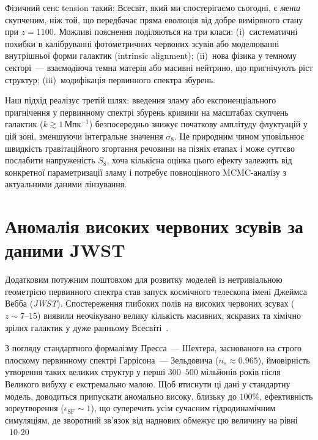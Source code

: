 Фізичний сенс tension такий: Всесвіт, який ми спостерігаємо сьогодні, є
\emph{менш} скупченим, ніж той, що передбачає пряма еволюція від добре
виміряного стану при $z=1100$. Можливі пояснення поділяються на три класи:
(i)~систематичні похибки в калібруванні фотометричних червоних зсувів або
моделюванні внутрішньої форми галактик (intrinsic alignment);
(ii)~нова фізика у темному секторі~--- взаємодіюча темна матерія або масивні
нейтрино, що пригнічують ріст структур;
(iii)~модифікація первинного спектра збурень.

Наш підхід реалізує третій шлях: введення зламу або експоненціального
пригнічення у первинному спектрі збурень кривини на масштабах скупчень
галактик ($k \gtrsim 1\,\text{Мпк}^{-1}$) безпосередньо знижує початкову
амплітуду флуктуацій у цій зоні, зменшуючи інтегральне значення $\sigma_8$.
Це природним чином уповільнює швидкість гравітаційного згортання речовини
на пізніх етапах і може суттєво послабити напруженість $S_8$, хоча кількісна
оцінка цього ефекту залежить від конкретної параметризації зламу і потребує
повноцінного MCMC-аналізу з актуальними даними лінзування.

\section{Аномалія високих червоних зсувів за даними JWST}
\label{sec:jwst}

Додатковим потужним поштовхом для розвитку моделей із нетривіальною геометрією первинного спектра став запуск космічного телескопа імені Джеймса Вебба (\emph{JWST}). Спостереження глибоких полів на високих червоних зсувах ($z \sim 7\text{--}15$) виявили неочікувано велику кількість масивних, яскравих та хімічно зрілих галактик у дуже ранньому Всесвіті~\cite{Labbe2023,Finkelstein2023}.

З погляду стандартного формалізму Пресса~--- Шехтера, заснованого на строго плоскому первинному спектрі Гаррісона~--- Зельдовича ($n_s \approx 0.965$), ймовірність утворення таких великих структур у перші $300\text{--}500$ мільйонів років після Великого вибуху є екстремально малою. Щоб втиснути ці дані у стандартну модель, доводиться припускати аномально високу, близьку до $100\%$, ефективність зореутворення ($\epsilon_\mathrm{SF} \sim 1$), що суперечить усім сучасним гідродинамічним симуляціям, де зворотний зв'язок від наднових обмежує цю величину на рівні ~10-20%

